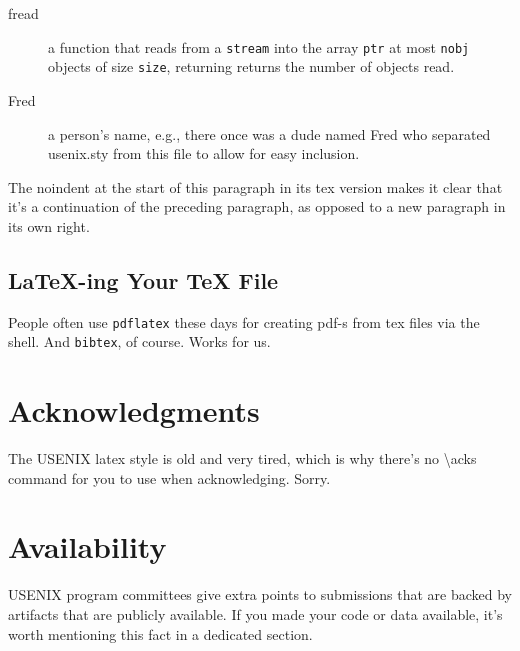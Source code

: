 \begin{description}
  
\item[fread] a function that reads from a \texttt{stream} into the
  array \texttt{ptr} at most \texttt{nobj} objects of size
  \texttt{size}, returning returns the number of objects read.

\item[Fred] a person's name, e.g., there once was a dude named Fred
  who separated usenix.sty from this file to allow for easy
  inclusion.
\end{description}

\noindent
The noindent at the start of this paragraph in its tex version makes
it clear that it's a continuation of the preceding paragraph, as
opposed to a new paragraph in its own right.


\subsection{LaTeX-ing Your TeX File}

People often use \texttt{pdflatex} these days for creating pdf-s from
tex files via the shell. And \texttt{bibtex}, of course. Works for us.

\section*{Acknowledgments}

The USENIX latex style is old and very tired, which is why
there's no \textbackslash{}acks command for you to use when
acknowledging. Sorry.

\section*{Availability}

USENIX program committees give extra points to submissions that are
backed by artifacts that are publicly available. If you made your code
or data available, it's worth mentioning this fact in a dedicated
section.






